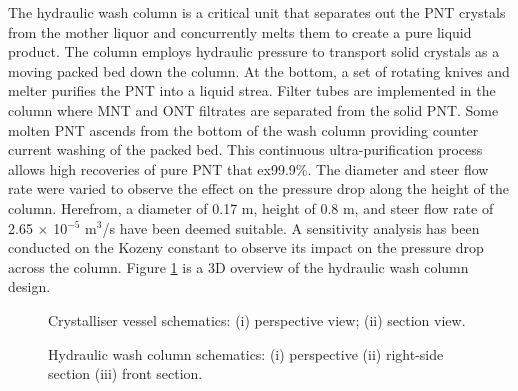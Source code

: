 The hydraulic wash column is a critical unit that separates out the PNT crystals from the mother liquor and concurrently melts them to create a pure liquid product. The column employs hydraulic pressure to transport solid crystals as a moving packed bed down the column. At the bottom, a set of rotating knives and melter purifies the PNT into a liquid strea. Filter tubes are implemented in the column where MNT and ONT filtrates are separated from the solid PNT. Some molten PNT ascends from the bottom of the wash column providing counter current washing of the packed bed. This continuous ultra-purification process allows high recoveries of pure PNT that ex99.9\%. The diameter and steer flow rate were varied to observe the effect on the pressure drop along the height of the column. Herefrom, a diameter of 0.17 m, height of 0.8 m, and steer flow rate of 2.65 $\times$ 10$^{-5}$ m$^{3}$/s have been deemed suitable. A sensitivity analysis has been conducted on the Kozeny constant to observe its impact on the pressure drop across the column. Figure \ref{fig:wash column schematic executive} is a 3D overview of the hydraulic wash column design.


\begin{figure}[h]
    \centering
    \begin{minipage}[t]{0.4\textwidth}
        
        \caption{Crystalliser vessel schematics: (i) perspective view; (ii) section view.}
        \label{fig:crystalliser schematic executive}
    \end{minipage}\hfill
    \begin{minipage}[t]{0.55\textwidth}
        
        \caption{Hydraulic wash column schematics: (i) perspective (ii) right-side section (iii) front section.}
        \label{fig:wash column schematic executive}
    \end{minipage}
\end{figure}
